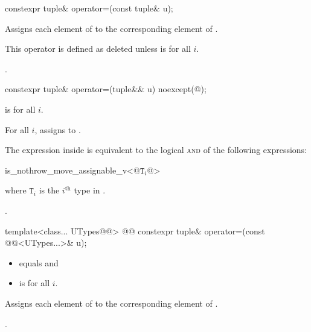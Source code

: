 \documentclass{wg21}
\begin{document}
%
\begin{itemdecl}
    constexpr tuple& operator=(const tuple& u);
\end{itemdecl}

\begin{itemdescr}
    \pnum
    \effects
    Assigns each element of  to the corresponding
    element of .
    
    \pnum
    \remarks
    This operator is defined as deleted unless
     is  for all $i$.
    
    \pnum
    \returns
    .
\end{itemdescr}

%
\begin{itemdecl}
    constexpr tuple& operator=(tuple&& u) noexcept(@\seebelow@);
\end{itemdecl}

\begin{itemdescr}
    \pnum
    \constraints
     is  for all $i$.
    
    \pnum
    \effects
    For all $i$, assigns  to
    .
    
    \pnum
    \remarks
    The expression inside  is equivalent to the logical \textsc{and} of the
    following expressions:
    
    \begin{codeblock}
        is_nothrow_move_assignable_v<@$\mathtt{T}_i$@>
    \end{codeblock}
    where $\mathtt{T}_i$ is the $i^\text{th}$ type in .
    
    \pnum
    \returns
    .
\end{itemdescr}

%
\begin{itemdecl}
    template<class... UTypes@@>
    @@
    constexpr tuple& operator=(const @@<UTypes...>& u);
\end{itemdecl}

\begin{itemdescr}
    \pnum
    \constraints
    \begin{itemize}
        \item {} equals  and
        \item {} is  for all $i$.
    \end{itemize}
    
    \pnum
    \effects
    Assigns each element of  to the corresponding element
    of .
    
    \pnum
    \returns
    .
\end{itemdescr}
\end{document}
